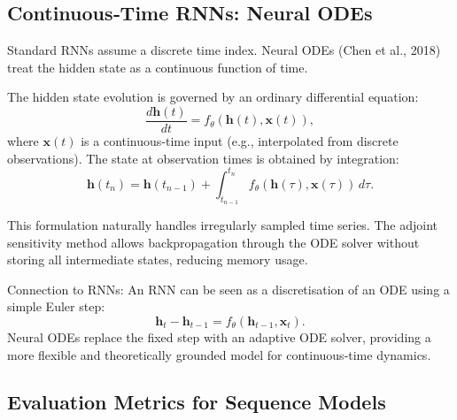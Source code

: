 \documentclass{tufte-handout}
\begin{document}
\subsection{Continuous‑Time RNNs: Neural ODEs}

Standard RNNs assume a discrete time index. Neural ODEs (Chen et al., 2018) treat the hidden state as a continuous function of time.

\begin{defn}
    The hidden state evolution is governed by an ordinary differential equation:
    \[
    \frac{d\mathbf{h}(t)}{dt} = f_\theta(\mathbf{h}(t), \mathbf{x}(t)),
    \]
    where $\mathbf{x}(t)$ is a continuous‑time input (e.g., interpolated from discrete observations). The state at observation times is obtained by integration:
    \[
    \mathbf{h}(t_n) = \mathbf{h}(t_{n-1}) + \int_{t_{n-1}}^{t_n} f_\theta(\mathbf{h}(\tau), \mathbf{x}(\tau)) \, d\tau.
    \]
\end{defn}

This formulation naturally handles irregularly sampled time series. The adjoint sensitivity method allows backpropagation through the ODE solver without storing all intermediate states, reducing memory usage.

\begin{marginfigure}
\centering
{}
\caption{Continuous hidden state $\mathbf{h}(t)$ (line) with discrete observations (dots) at irregular times.}
\end{marginfigure}

Connection to RNNs: An RNN can be seen as a discretisation of an ODE using a simple Euler step:
\[
\mathbf{h}_t - \mathbf{h}_{t-1} = f_\theta(\mathbf{h}_{t-1}, \mathbf{x}_t).
\]
Neural ODEs replace the fixed step with an adaptive ODE solver, providing a more flexible and theoretically grounded model for continuous‑time dynamics.

\subsection{Evaluation Metrics for Sequence Models}
\end{document}
